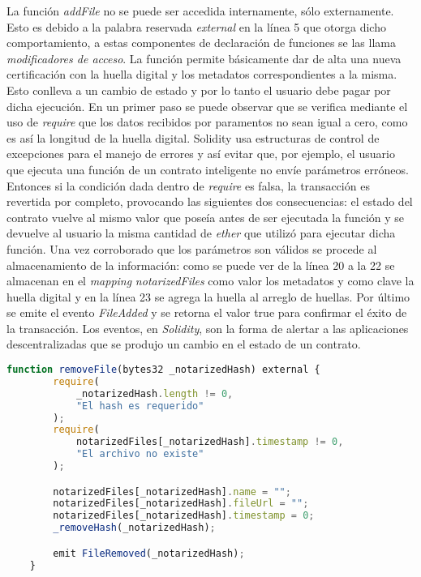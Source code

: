 La función \textit{addFile} no se puede ser accedida internamente, sólo externamente. Esto es debido a la palabra reservada \textit{external} en la línea 5 que otorga dicho comportamiento, a estas componentes de declaración de funciones se las llama \textit{modificadores de acceso}. La función permite básicamente dar de alta una nueva certificación con la huella digital y los metadatos correspondientes a la misma. Esto conlleva a un cambio de estado y por lo tanto el usuario debe pagar por dicha ejecución. En un primer paso se puede observar que se verifica mediante el uso de \textit{require} que los datos recibidos por paramentos no sean igual a cero, como es así la longitud de la huella digital. Solidity usa estructuras de control de excepciones para el manejo de errores y así evitar que, por ejemplo, el usuario que ejecuta una función de un contrato inteligente no envíe parámetros erróneos. Entonces si la condición dada dentro de \textit{require} es falsa, la transacción es revertida por completo, provocando las siguientes dos consecuencias: el estado del contrato vuelve al mismo valor que poseía antes de ser ejecutada la función y se devuelve al usuario la misma cantidad de \textit{ether} que utilizó para ejecutar dicha función.
Una vez corroborado que los parámetros son válidos se procede al almacenamiento de la información: como se puede ver de la línea 20 a la 22 se almacenan en el \textit{mapping} \textit{notarizedFiles} como valor los metadatos y como clave la huella digital y en la línea 23 se agrega la huella al arreglo de huellas. Por último se emite el evento \textit{FileAdded} y se retorna el valor true para confirmar el éxito de la transacción. Los eventos, en \textit{Solidity}, son la forma de alertar a las aplicaciones descentralizadas que se produjo un cambio en el estado de un contrato.

\begin{minipage}{\linewidth}
  \begin{lstlisting}[frame=single, belowskip=1em, aboveskip=2em,  language=javascript, captionpos=b, caption=Función removeFile, label={lst:post_archivo}]
    function removeFile(bytes32 _notarizedHash) external {
        require(
            _notarizedHash.length != 0,
            "El hash es requerido"
        );
        require(
            notarizedFiles[_notarizedHash].timestamp != 0,
            "El archivo no existe"
        );

        notarizedFiles[_notarizedHash].name = "";
        notarizedFiles[_notarizedHash].fileUrl = "";
        notarizedFiles[_notarizedHash].timestamp = 0;
        _removeHash(_notarizedHash);

        emit FileRemoved(_notarizedHash);
    }
  \end{lstlisting}
\end{minipage}

